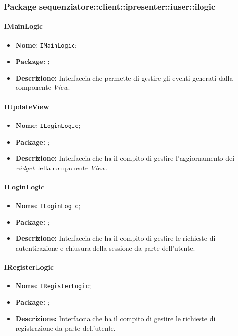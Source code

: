 \iffalse
model::localdataprocessowner::ProcessOwnerData
\fi

\subsubsection{Package sequenziatore::client::ipresenter::iuser::ilogic}

\paragraph{IMainLogic}
\begin{itemize}
\item \textbf{Nome:} \texttt{IMainLogic};
\item \textbf{Package:} \texttt{\iLogicUser{}};
\item \textbf{Descrizione:} Interfaccia che permette di gestire gli eventi generati dalla componente \textit{View}.
\end{itemize}

\paragraph{IUpdateView}
\begin{itemize}
\item \textbf{Nome:} \texttt{ILoginLogic};
\item \textbf{Package:} \texttt{\iLogicUser{}};
\item \textbf{Descrizione:} Interfaccia che ha il compito di gestire l'aggiornamento dei \textit{widget} della componente \textit{View}.
\end{itemize}

\paragraph{ILoginLogic}
\begin{itemize}
\item \textbf{Nome:} \texttt{ILoginLogic};
\item \textbf{Package:} \texttt{\iLogicUser{}};
\item \textbf{Descrizione:} Interfaccia che ha il compito di gestire le richieste di autenticazione e chiusura della sessione da parte dell'utente.
\end{itemize}

\paragraph{IRegisterLogic}
\begin{itemize}
\item \textbf{Nome:} \texttt{IRegisterLogic};
\item \textbf{Package:} \texttt{\iLogicUser{}};
\item \textbf{Descrizione:} Interfaccia che ha il compito di gestire le richieste di registrazione da parte dell'utente.
\end{itemize}

